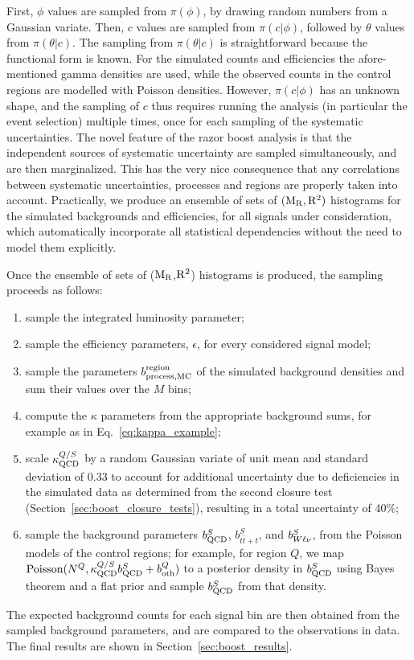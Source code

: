 First, $\phi$ values are sampled from $\pi(\phi)$, by drawing random numbers from a Gaussian
variate.
Then, $c$ values are sampled from $\pi(c | \phi)$, followed by $\theta$ values from $\pi(\theta |
c)$. 
The sampling from $\pi(\theta|c)$ is straightforward because the functional form is known.
For the simulated counts and efficiencies the afore-mentioned gamma densities are used, while the
observed counts in the control regions are modelled with Poisson densities.
%
However, $\pi(c | \phi)$ has an unknown shape, and the sampling of $c$ thus requires running the
analysis (in particular the event selection) multiple times, once for each sampling of the
systematic uncertainties. 
The novel feature of the razor boost analysis is that the independent sources of systematic
uncertainty are sampled simultaneously, and are then marginalized. This has the very
nice consequence that any correlations between systematic uncertainties, processes and
regions are properly taken into account. Practically, we produce an ensemble of sets of $(\mathrm{M_R},
\mathrm{R^2})$ histograms for the simulated backgrounds and efficiencies, for all
signals under consideration, which automatically incorporate all statistical dependencies
without the need to model them explicitly. 

Once the ensemble of sets of ($\mathrm{M_R}$,$\mathrm{R^2}$) histograms is produced, the sampling proceeds
as follows:
\begin{enumerate}
\item sample the integrated luminosity parameter;
\item sample the efficiency parameters, $\epsilon$, for every considered signal model;
\item sample the parameters $b^{\rm region}_{\rm process, MC}$ of the simulated background densities
and sum their values over the $M$ bins;
\item compute the $\kappa$ parameters from the appropriate background sums, for example as in
Eq.~\ref{eq:kappa_example};
\item scale $\kappa^{Q/S}_{\rm QCD}$ by a random Gaussian variate of unit mean and standard
deviation of 0.33 to account for additional uncertainty due to deficiencies in the
simulated data as determined from the second closure test (Section~\ref{sec:boost_closure_tests}),
resulting in a total uncertainty of 40\%;
\item sample the background parameters $b^S_{\rm QCD}$, $b^S_{t\bar{t}+t}$, and $b^S_{W\ell\nu}$,
from the Poisson models  of the control regions; for example, for region $Q$, we map 
$\textrm{Poisson}(N^Q, \kappa^{Q/S}_{\rm QCD} b^S_{\rm QCD} + b^Q_{\rm oth})$ to a posterior density
in $b^S_{\rm QCD}$ using Bayes theorem and a flat prior and sample $b^S_{\rm QCD}$ from that
density.
\end{enumerate}
The expected background counts for each signal bin are then obtained from the sampled background
parameters, and are compared to the observations in data. The final results are shown in
Section~\ref{sec:boost_results}.

